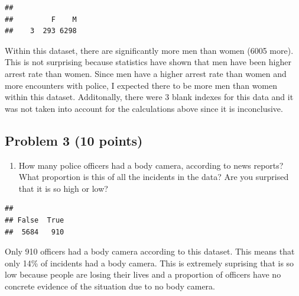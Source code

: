 \documentclass[
]{article}
\newenvironment{Shaded}{\begin{snugshade}}{\end{snugshade}}
\newcommand{\FunctionTok}[1]{\textcolor[rgb]{0.00,0.00,0.00}{#1}}
\newcommand{\NormalTok}[1]{#1}
\newcommand{\SpecialCharTok}[1]{\textcolor[rgb]{0.00,0.00,0.00}{#1}}
\providecommand{\tightlist}{%
  \setlength{\itemsep}{0pt}\setlength{\parskip}{0pt}}
\begin{document}
\begin{Shaded}
\end{Shaded}

\begin{verbatim}
## 
##         F    M 
##    3  293 6298
\end{verbatim}

Within this dataset, there are significantly more men than women (6005
more). This is not surprising because statistics have shown that men
have been higher arrest rate than women. Since men have a higher arrest
rate than women and more encounters with police, I expected there to be
more men than women within this dataset. Additonally, there were 3 blank
indexes for this data and it was not taken into account for the
calculations above since it is inconclusive.

\hypertarget{problem-3-10-points}{%
\subsection{Problem 3 (10 points)}\label{problem-3-10-points}}

\begin{enumerate}
\def\labelenumi{\alph{enumi}.}
\tightlist
\item
  How many police officers had a body camera, according to news reports?
  What proportion is this of all the incidents in the data? Are you
  surprised that it is so high or low?
\end{enumerate}

\begin{Shaded}
\end{Shaded}

\begin{verbatim}
## 
## False  True 
##  5684   910
\end{verbatim}

Only 910 officers had a body camera according to this dataset. This
means that only 14\% of incidents had a body camera. This is extremely
suprising that is so low because people are losing their lives and a
proportion of officers have no concrete evidence of the situation due to
no body camera.
\end{document}
